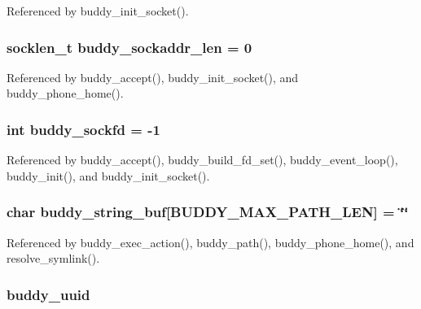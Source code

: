 Referenced by buddy\_\-init\_\-socket().

\subsubsection[{buddy\_\-sockaddr\_\-len}]{\setlength{\rightskip}{0pt plus 5cm}socklen\_\-t {\bf buddy\_\-sockaddr\_\-len} = 0\hspace{0.3cm}{\ttfamily  [static]}}\label{buddy_8c_a7f4dab67028a885153a9ec78d40f9a48}


Referenced by buddy\_\-accept(), buddy\_\-init\_\-socket(), and buddy\_\-phone\_\-home().

\subsubsection[{buddy\_\-sockfd}]{\setlength{\rightskip}{0pt plus 5cm}int {\bf buddy\_\-sockfd} = -\/1\hspace{0.3cm}{\ttfamily  [static]}}\label{buddy_8c_ab8ae7575757371a277bb048389ca9f84}


Referenced by buddy\_\-accept(), buddy\_\-build\_\-fd\_\-set(), buddy\_\-event\_\-loop(), buddy\_\-init(), and buddy\_\-init\_\-socket().

\subsubsection[{buddy\_\-string\_\-buf}]{\setlength{\rightskip}{0pt plus 5cm}char {\bf buddy\_\-string\_\-buf}[BUDDY\_\-MAX\_\-PATH\_\-LEN] = \char`\"{}\char`\"{}\hspace{0.3cm}{\ttfamily  [static]}}\label{buddy_8c_a12b4e74d3f481815831cbeb5cde0d996}


Referenced by buddy\_\-exec\_\-action(), buddy\_\-path(), buddy\_\-phone\_\-home(), and resolve\_\-symlink().

\subsubsection[{buddy\_\-uuid}]{ {\bf buddy\_\-uuid}}\label{buddy_8c_a3e9321d881ca257289c65b5022b693c8}



